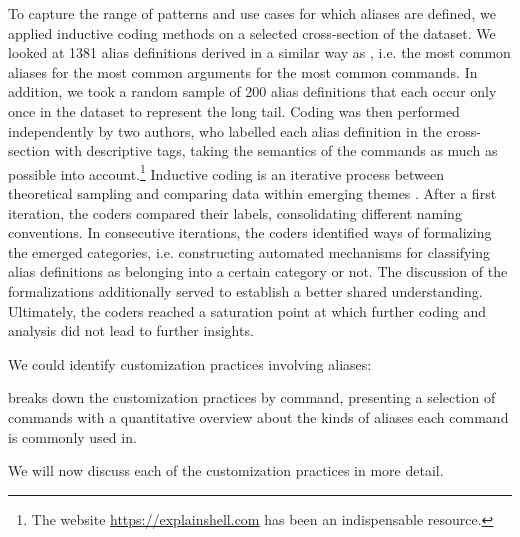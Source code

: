 To capture the range of patterns and use cases for which aliases are defined, we applied inductive coding methods on a selected cross-section of the dataset.
We looked at 1381 alias definitions derived in a similar way as , i.e. the most common aliases for the most common arguments for the most common commands.
In addition, we took a random sample of 200 alias definitions that each occur only once in the dataset to represent the long tail.
Coding was then performed independently by two authors, who labelled each alias definition in the cross-section with descriptive tags, taking the semantics of the commands as much as possible into account.\footnote{The website \url{https://explainshell.com} has been an indispensable resource.}
Inductive coding is an iterative process between theoretical sampling and comparing data within emerging themes \cite{thomas:06,dey:03}.
After a first iteration, the coders compared their labels, consolidating different naming conventions.
In consecutive iterations, the coders identified ways of formalizing the emerged categories, i.e. constructing automated mechanisms for classifying alias definitions as belonging into a certain category or not.
The discussion of the formalizations additionally served to establish a better shared understanding.
Ultimately, the coders reached a saturation point at which further coding and analysis did not lead to further insights.

We could identify \TODO customization practices involving aliases:

\TODO

 breaks down the customization practices by command, presenting a selection of commands with a quantitative overview about the kinds of aliases each command is commonly used in.

We will now discuss each of the \TODO customization practices in more detail.

%













